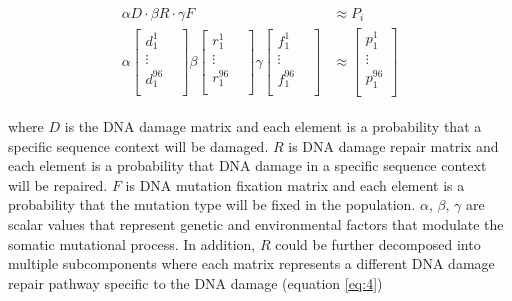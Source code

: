 \begin{align}
\begin{split} 
\alpha D \cdot \beta R \cdot \gamma F &\approx P_{i} \label{eq:3} \\
\alpha \begin{bmatrix}
    d^{1}_{1}  \\
    \vdots &  \\
    d^{96}_{1}  \\
\end{bmatrix} 
\beta \begin{bmatrix}
    r^{1}_{1} \\
    \vdots &  \\
    r^{96}_{1} \\
\end{bmatrix} 
\gamma \begin{bmatrix}
    f^{1}_{1}  \\
    \vdots &  \\
    f^{96}_{1}  \\
\end{bmatrix} &\approx
\begin{bmatrix}
    p^{1}_{1} \\
    \vdots \\
    p^{96}_{1} \\
\end{bmatrix}
\end{split}
\end{align}

where $D$ is the DNA damage matrix and each element is a probability that a specific sequence context will be damaged. $R$ is DNA damage repair matrix and each element is a probability that DNA damage in a specific sequence context will be repaired. $F$ is DNA mutation fixation matrix and each element is a probability that the mutation type will be fixed in the population. $\alpha$, $\beta$, $\gamma$ are scalar values that represent genetic and environmental factors that modulate the somatic mutational process. In addition, $R$ could be further decomposed into multiple subcomponents where each matrix represents a different DNA damage repair pathway specific to the DNA damage (equation  \ref{eq:4})

